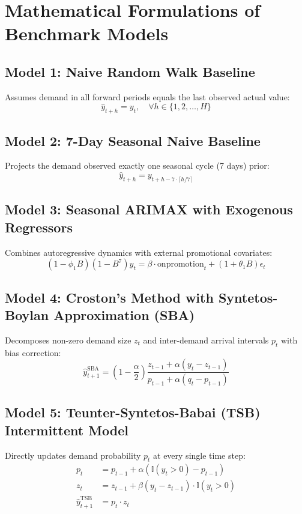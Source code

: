 \documentclass[12pt,a4paper,oneside]{report}
\theoremstyle{definition}
\begin{document}
\section{Mathematical Formulations of Benchmark Models}

\subsection{Model 1: Naive Random Walk Baseline}
Assumes demand in all forward periods equals the last observed actual value:
\begin{equation}
\hat{y}_{t+h} = y_t, \quad \forall h \in \{1, 2, \dots, H\}
\end{equation}

\subsection{Model 2: 7-Day Seasonal Naive Baseline}
Projects the demand observed exactly one seasonal cycle (7 days) prior:
\begin{equation}
\hat{y}_{t+h} = y_{t+h - 7 \cdot \lceil h/7 \rceil}
\end{equation}

\subsection{Model 3: Seasonal ARIMAX with Exogenous Regressors}
Combines autoregressive dynamics with external promotional covariates:
\begin{equation}
(1 - \phi_1 B)(1 - B^7) y_t = \beta \cdot \text{onpromotion}_t + (1 + \theta_1 B)\epsilon_t
\end{equation}

\subsection{Model 4: Croston's Method with Syntetos-Boylan Approximation (SBA)}
Decomposes non-zero demand size $z_t$ and inter-demand arrival intervals $p_t$ with bias correction:
\begin{equation}
\hat{y}_{t+1}^{\text{SBA}} = \left(1 - \frac{\alpha}{2}\right) \frac{z_{t-1} + \alpha(y_t - z_{t-1})}{p_{t-1} + \alpha(q_t - p_{t-1})}
\end{equation}

\subsection{Model 5: Teunter-Syntetos-Babai (TSB) Intermittent Model}
Directly updates demand probability $p_t$ at every single time step:
\begin{align}
p_t &= p_{t-1} + \alpha \left(\mathbb{I}(y_t > 0) - p_{t-1}\right) \\
z_t &= z_{t-1} + \beta (y_t - z_{t-1}) \cdot \mathbb{I}(y_t > 0) \\
\hat{y}_{t+1}^{\text{TSB}} &= p_t \cdot z_t
\end{align}
\end{document}
